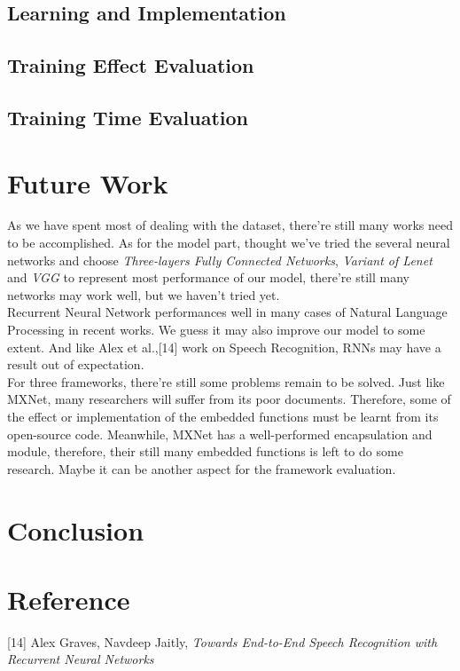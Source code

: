 \documentclass[12pt]{article}
\begin{document}
\subsection{Learning and Implementation}

\subsection{Training Effect Evaluation}

\subsection{Training Time Evaluation}

\section{Future Work}
As we have spent most of dealing with the dataset, there're still many works need to be accomplished.
As for the model part, thought we've tried the several neural networks and choose {\it Three-layers Fully Connected Networks}, {\it Variant of Lenet} and {\it VGG} to represent most performance of our model, there're still many networks may work well, but we haven't tried yet.\\
Recurrent Neural Network performances well in many cases of Natural Language Processing in recent works. We guess it may also improve our model to some extent. And like Alex et al.,[14] work on Speech Recognition, RNNs may have a result out of expectation.\\
For three frameworks, there're still some problems remain to be solved. Just like MXNet, many researchers will suffer from its poor documents. Therefore, some of the effect or implementation of the embedded functions must be learnt from its open-source code. Meanwhile, MXNet has a well-performed encapsulation and module, therefore, their still many embedded functions is left to do some research. Maybe it can be another aspect for the framework evaluation.\\


\section{Conclusion}

\section{Reference}
[14] Alex Graves, Navdeep Jaitly, {\it Towards End-to-End Speech Recognition with Recurrent Neural Networks}
\end{document}
